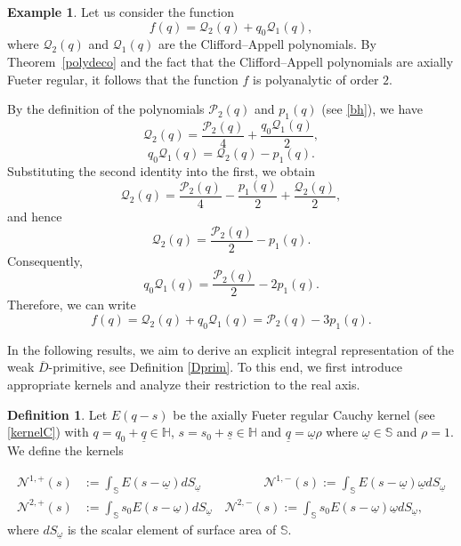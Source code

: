 \documentclass[reqno,11pt]{amsart}
\numberwithin{equation}{section}
\newcommand{\unq}{\underline{q}}
\newcommand{\uns}{\underline{s}}
\theoremstyle{definition}
\newtheorem{definition}[theorem]{Definition}
\newtheorem{example}[theorem]{Example}
\begin{document}
\begin{example}
Let us consider the function
$$
f(q)= \mathcal{Q}_2(q)+q_0 \mathcal{Q}_1(q),
$$
where $\mathcal{Q}_2(q)$ and $\mathcal{Q}_1(q)$ are the Clifford--Appell polynomials. By Theorem~\ref{polydeco} and the fact that the Clifford--Appell polynomials are axially Fueter regular, it follows that the function $f$ is polyanalytic of order $2$.
	
By the definition of the polynomials $\mathcal{P}_2(q)$ and $p_1(q)$ (see \eqref{bh}), we have
$$
\mathcal{Q}_2(q)= \frac{\mathcal{P}_2(q)}{4}+ \frac{q_0 \mathcal{Q}_1(q)}{2},
$$
$$
q_0 \mathcal{Q}_1(q)=\mathcal{Q}_2(q)-p_1(q).
$$
Substituting the second identity into the first, we obtain
$$
\mathcal{Q}_2(q)=\frac{\mathcal{P}_2(q)}{4}- \frac{p_1(q)}{2}+\frac{\mathcal{Q}_2(q)}{2},
$$
	and hence
$$
\mathcal{Q}_2(q)= \frac{\mathcal{P}_2(q)}{2}-p_1(q).
$$
Consequently,
$$
q_0 \mathcal{Q}_1(q)= \frac{\mathcal{P}_2(q)}{2}-2p_1(q).
$$
Therefore, we can write
$$
f(q)=\mathcal{Q}_2(q)+q_0 \mathcal{Q}_1(q)= \mathcal{P}_2(q)-3p_1(q).
$$
\end{example}






In the following results, we aim to derive an explicit integral representation of the weak $\overline{D}$-primitive, see Definition \ref{Dprim}. To this end, we first introduce appropriate kernels and analyze their restriction to the real axis.

\begin{definition} \label{d1} Let $E(q-s)$ be the axially Fueter regular Cauchy kernel (see \eqref{kernelC}) with $q=q_0+\unq\in\mathbb H$, $s=s_0+\uns\in\mathbb H$ and $\unq=\underline{\omega} \rho$ where $\underline{\omega}\in\mathbb S$ and $\rho=1$. We define the kernels
	
	\begin{align*}
		\mathcal{N}^{1,+}\left (s \right)&:=\int_{\mathbb S} E\left( s - \underline{\omega} \right) dS_{\underline{\omega}}\quad\quad\quad\quad\quad
		\mathcal{N}^{1,-}\left(s \right):=\int_{\mathbb S} E\left( s - \underline{\omega} \right) \underline{\omega} dS_{\underline{\omega}}\\
		\mathcal{N}^{2,+}\left(s \right) &:= \int_{\mathbb S} s_0 E\left( s - \underline{\omega} \right) dS_{\underline{\omega}}\quad
		\mathcal{N}^{2,-}\left(s  \right) :=\int_{\mathbb S}  s_0 E\left( s - \underline{\omega} \right)  \underline{\omega} dS_{\underline{\omega}},
	\end{align*}
	where $dS_{\underline{\omega}}$ is the scalar element of surface area of $\mathbb S$.
\end{definition}
\end{document}
